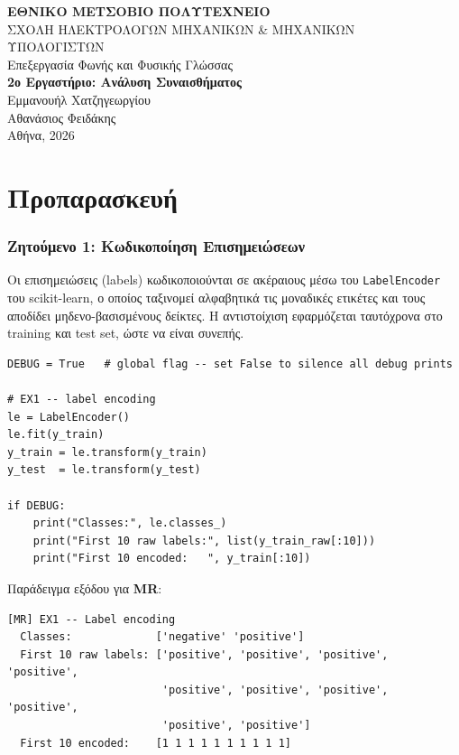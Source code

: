 \documentclass[12pt]{article}
\begin{document}
\begin{titlepage}
\centering
\vspace*{2cm}

{\large\bfseries ΕΘΝΙΚΟ ΜΕΤΣΟΒΙΟ ΠΟΛΥΤΕΧΝΕΙΟ}\\[0.4em]
{\large ΣΧΟΛΗ ΗΛΕΚΤΡΟΛΟΓΩΝ ΜΗΧΑΝΙΚΩΝ \& ΜΗΧΑΝΙΚΩΝ}\\[0.2em]
{\large ΥΠΟΛΟΓΙΣΤΩΝ}\\[2.5cm]

{\large Επεξεργασία Φωνής και Φυσικής Γλώσσας}\\[1.5cm]

{\LARGE\bfseries 2ο Εργαστήριο: Ανάλυση Συναισθήματος}\\[3cm]

{\large Εμμανουήλ Χατζηγεωργίου }\\[0.5em]
{\large Αθανάσιος Φειδάκης }\\[2.5cm]

\vfill
{\large Αθήνα, 2026}
\end{titlepage}

\part{Προπαρασκευή}
\setcounter{secnumdepth}{0}

\section{Ζητούμενο 1: Κωδικοποίηση Επισημειώσεων}

Οι επισημειώσεις (labels) κωδικοποιούνται σε ακέραιους μέσω του
\texttt{LabelEncoder} του scikit-learn, ο οποίος ταξινομεί αλφαβητικά
τις μοναδικές ετικέτες και τους αποδίδει μηδενο-βασισμένους δείκτες.
Η αντιστοίχιση εφαρμόζεται ταυτόχρονα στο training και test set, ώστε
να είναι συνεπής.

\begin{lstlisting}
DEBUG = True   # global flag -- set False to silence all debug prints

# EX1 -- label encoding
le = LabelEncoder()
le.fit(y_train)
y_train = le.transform(y_train)
y_test  = le.transform(y_test)

if DEBUG:
    print("Classes:", le.classes_)
    print("First 10 raw labels:", list(y_train_raw[:10]))
    print("First 10 encoded:   ", y_train[:10])
\end{lstlisting}

Παράδειγμα εξόδου για \textbf{MR}:

\begin{lstlisting}[language={}]
[MR] EX1 -- Label encoding
  Classes:             ['negative' 'positive']
  First 10 raw labels: ['positive', 'positive', 'positive', 'positive',
                        'positive', 'positive', 'positive', 'positive',
                        'positive', 'positive']
  First 10 encoded:    [1 1 1 1 1 1 1 1 1 1]
\end{lstlisting}
\end{document}

